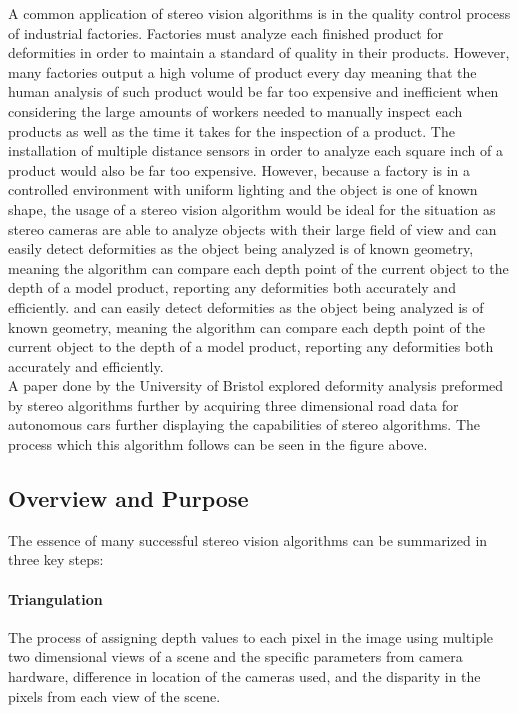 \documentclass[11pt]{scrartcl}
\begin{document}
A common application of stereo vision algorithms is in the quality
control process of industrial factories. Factories must analyze each
finished product for deformities in order to maintain a standard of quality in their
products. However, many factories output a high volume of product every day meaning that
the human analysis of such product would be far too expensive and inefficient when
considering the large amounts of workers needed to manually inspect each products
as well as the time it takes for the inspection of a product. The installation of multiple
distance sensors in order to analyze each square inch of a product would also be far too expensive.
However, because a factory is in a controlled environment with uniform lighting and the object is one
of known shape, the usage of a stereo vision algorithm would be ideal for the situation as stereo cameras
are able to analyze objects with their large field of view and can easily detect deformities as the object
being analyzed is of known geometry, meaning the algorithm can compare each depth point of the current object
to the depth of a model product, reporting any deformities both accurately and efficiently.  and can easily detect deformities as the object
being analyzed is of known geometry, meaning the algorithm can compare each depth point of the current object
to the depth of a model product, reporting any deformities both accurately and efficiently. \\

A paper done by the University of Bristol explored deformity analysis preformed by stereo algorithms
further by acquiring three dimensional road data for autonomous cars further displaying the
capabilities of stereo algorithms. The process which this algorithm follows can be seen in the
figure above.

\subsection{Overview and Purpose}

The essence of many successful stereo vision algorithms can be summarized in three key steps:

 
  \paragraph{ Triangulation} The process of assigning depth values to each pixel in the image
        using multiple two dimensional views of a scene and the specific parameters from
        camera hardware, difference in location of the cameras used, and the disparity in the
        pixels from each view of the scene.
\end{document}
